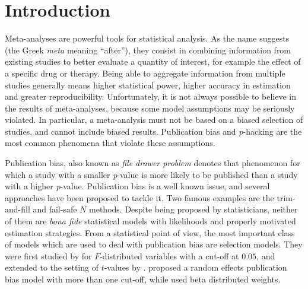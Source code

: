 \documentclass[preprint, authoryear]{elsarticle}
\theoremstyle{plain}
\theoremstyle{definition}
\begin{document}



\section{Introduction}

Meta-analyses are powerful tools for statistical analysis. As the name suggests (the Greek \emph{meta} meaning ``after''), they consist in combining information from existing studies to better evaluate a quantity of interest, for example the effect of a specific drug or therapy. Being able to aggregate information from multiple studies generally means higher statistical power, higher accuracy in estimation and greater reproducibility. Unfortunately, it is not always possible to believe in the results of meta-analyses, because some model assumptions may be seriously violated. In particular, a meta-analysis must not be based on a biased selection of studies, and cannot include biased results. Publication bias \citep{sterling1959publication} and \emph{p}-hacking \citep{simmons2011false} are the most common phenomena that violate these assumptions. 

Publication bias, also known as \emph{file drawer problem} \citep[see, e.g.,][]{iyengar1988selection} denotes that phenomenon for which a study with a smaller \emph{p}-value is more likely to be published than a study with a higher \emph{p}-value. Publication bias is a well known issue, and several approaches have been proposed to tackle it. Two famous examples are the trim-and-fill \citep{duval2000trim} and fail-safe $N$ \citep{becker2005failsafe} methods. Despite being proposed by statisticians, neither of them are \emph{bona fide} statistical models with likelihoods and properly motivated estimation strategies. From a statistical point of view, the most important class of models which are used to deal with publication bias are selection models. They were first studied by \citet{hedges1984estimation} for $F$-distributed variables with a cut-off at $0.05$, and extended to the setting of $t$-values by \citet{iyengar1988selection}. \citet{hedges1992modeling} proposed a random effects publication bias model with more than one cut-off, while \citet{citkowicz2017parsimonious} used beta distributed weights.
\end{document}
